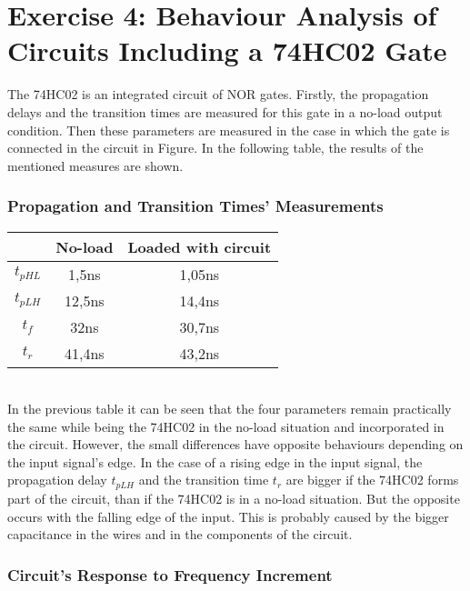 \documentclass[a4paper,11pt]{report}
\begin{document}
\section{\color{olive}Exercise 4: Behaviour Analysis of Circuits Including a 74HC02 Gate}

The 74HC02 is an integrated circuit of NOR gates. Firstly, the propagation delays and the transition times are measured for this gate in a no-load output condition. Then these parameters are measured in the case in which the gate is connected in the circuit in Figure. %
In the following table, the results of the mentioned measures are shown.

\subsubsection{\color{red}Propagation and Transition Times' Measurements}

\begin{tabular}{|c|c|c|}
\hline
 &No-load & Loaded with circuit \\ %
\hline
\hline
$t_{pHL}$ & 1,5ns & 1,05ns \\
\hline
$t_{pLH}$ & 12,5ns & 14,4ns\\
\hline
$t_{f}$ & 32ns & 30,7ns\\
\hline
$t_{r}$ & 41,4ns & 43,2ns \\
\hline
\end{tabular}\\



In the previous table it can be seen that the four parameters remain practically the same while being the 74HC02 in the no-load situation and incorporated in the circuit. However, the small differences have opposite behaviours depending on the input signal's edge. In the case of a rising edge in the input signal, the propagation delay $t_{pLH}$ and the transition time $t_{r}$ are bigger if the 74HC02 forms part of the circuit, than if the 74HC02 is in a no-load situation. But the opposite occurs with the falling edge of the input. This is probably caused by the bigger capacitance in the wires and in the components of the circuit.

\subsubsection{\color{red}Circuit's Response to Frequency Increment}
\end{document}
